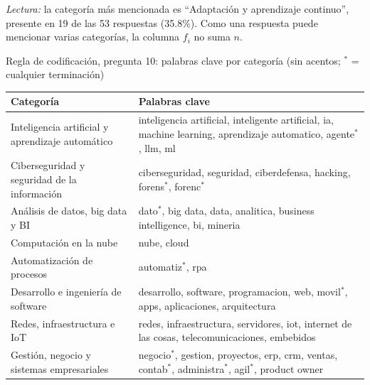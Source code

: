 \textit{Lectura:} la categoría más mencionada es ``Adaptación y aprendizaje continuo'', presente en 19 de las 53 respuestas (35.8\%). Como una respuesta puede mencionar varias categorías, la columna $f_i$ no suma $n$.

\begin{mitabla}{Regla de codificación, pregunta 10: palabras clave por categoría (sin acentos; $^{*}$ = cualquier terminación)}
\begin{tabular}{L{5.2cm}L{9.4cm}}
\toprule
Categoría & Palabras clave \\
\midrule
Inteligencia artificial y aprendizaje automático & inteligencia artificial, inteligente artificial, ia, machine learning, aprendizaje automatico, agente$^{*}$, llm, ml \\
Ciberseguridad y seguridad de la información & ciberseguridad, seguridad, ciberdefensa, hacking, forens$^{*}$, forenc$^{*}$ \\
Análisis de datos, big data y BI & dato$^{*}$, big data, data, analitica, business intelligence, bi, mineria \\
Computación en la nube & nube, cloud \\
Automatización de procesos & automatiz$^{*}$, rpa \\
Desarrollo e ingeniería de software & desarrollo, software, programacion, web, movil$^{*}$, apps, aplicaciones, arquitectura \\
Redes, infraestructura e IoT & redes, infraestructura, servidores, iot, internet de las cosas, telecomunicaciones, embebidos \\
Gestión, negocio y sistemas empresariales & negocio$^{*}$, gestion, proyectos, erp, crm, ventas, contab$^{*}$, administra$^{*}$, agil$^{*}$, product owner \\
\bottomrule
\end{tabular}
\end{mitabla}

